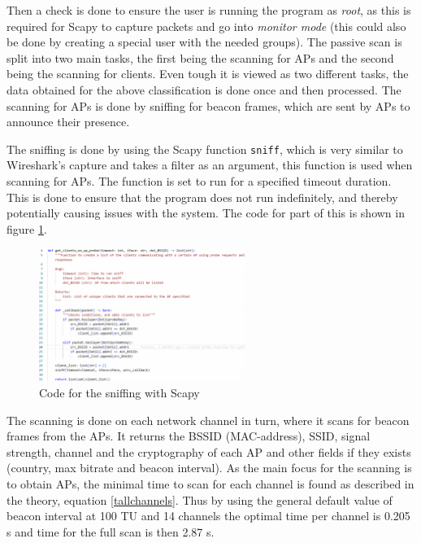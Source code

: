 Then a check is done to ensure the user is running the program as \textit{root}, as this is required for Scapy to capture packets and go into \textit{monitor mode} (this could also be done by creating a special user with the needed groups). The passive scan is split into two main tasks, the first being the scanning for APs and the second being the scanning for clients. 
Even tough it is viewed as two different tasks, the data obtained for the above classification is done once and then processed.
The scanning for APs is done by sniffing for beacon frames, which are sent by APs to announce their presence.

The sniffing is done by using the Scapy function \lstinline{sniff}, which is very similar to Wireshark's capture and takes a filter as an argument, this function is used when scanning for APs. The function is set to run for a specified timeout duration. This is done to ensure that the program does not run indefinitely, and thereby potentially causing issues with the system. The code for part of this is shown in figure \ref{Scan1}.
\begin{figure}[!htbp]
    \centering
    \includegraphics[width=0.6\textwidth]{Latex-Files/Billeder/Implementation/AP_Scan.png}
    \caption{Code for the sniffing with Scapy}
    \label{Scan1}
\end{figure}

The scanning is done on each network channel in turn, where it scans for beacon frames from the APs. It returns the BSSID (MAC-address), SSID, signal strength, channel and the cryptography of each AP and other fields if they exists (country, max bitrate and beacon interval). As the main focus for the scanning is to obtain APs, the minimal time to scan for each channel is found as described in the theory, equation \ref{tallchannels}. Thus by using the general default value of beacon interval at 100 TU and 14 channels the optimal time per channel is 0.205 s and time for the full scan is then 2.87 s.  

